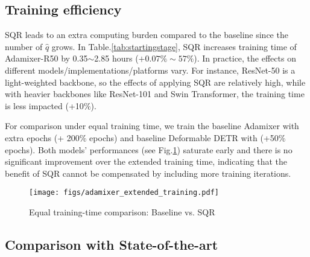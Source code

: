 \documentclass[10pt,twocolumn,letterpaper]{article}
\begin{document}
\subsection{Training efficiency}


SQR leads to an extra computing burden compared to the baseline since the number of $\hat{q}$ grows. In Table.\ref{tab:startingstage}, SQR increases training time of Adamixer-R50 by 0.35$\sim$2.85 hours ($+0.07\%\sim 57\%$). In practice, the effects on different models/implementations/platforms vary. For instance, ResNet-50 is a light-weighted backbone, so the effects of applying SQR are relatively high, while with heavier backbones like ResNet-101 and Swin Transformer\cite{Liu2021SwinTH}, the training time is less impacted (+10$\%$). 




For comparison under equal training time, we train the baseline Adamixer with extra epochs (+ 200$\%$ epochs) and baseline Deformable DETR with (+50$\%$ epochs). Both models' performances (see Fig.\ref{fig:training_time}) saturate early and there is no significant improvement over the extended training time, indicating that the benefit of SQR cannot be compensated by including more training iterations.

\begin{figure}[]
    \texttt{[image: figs/adamixer\_extended\_training.pdf]}
    \caption{Equal training-time comparison: Baseline vs. SQR}
    \label{fig:training_time}
\end{figure}


\subsection{Comparison with State-of-the-art}
\end{document}
